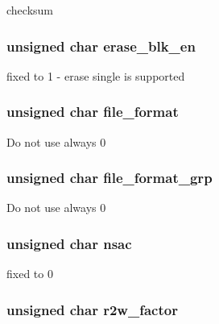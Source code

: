 checksum \hypertarget{struct_c_s_d_v2_aa0ada858f4a1455c6cb4e9b7523d8fd1}{
\subsubsection[{erase\-\_\-blk\-\_\-en}]{\setlength{\rightskip}{0pt plus 5cm}unsigned char erase\-\_\-blk\-\_\-en}}\label{struct_c_s_d_v2_aa0ada858f4a1455c6cb4e9b7523d8fd1}
fixed to 1 -\/ erase single is supported \hypertarget{struct_c_s_d_v2_aa1a7dd102774cf915cbe66010250253d}{
\subsubsection[{file\-\_\-format}]{\setlength{\rightskip}{0pt plus 5cm}unsigned char file\-\_\-format}}\label{struct_c_s_d_v2_aa1a7dd102774cf915cbe66010250253d}
Do not use always 0 \hypertarget{struct_c_s_d_v2_aa44f7b6ef5fd710a716fa9ef045c68f0}{
\subsubsection[{file\-\_\-format\-\_\-grp}]{\setlength{\rightskip}{0pt plus 5cm}unsigned char file\-\_\-format\-\_\-grp}}\label{struct_c_s_d_v2_aa44f7b6ef5fd710a716fa9ef045c68f0}
Do not use always 0 \hypertarget{struct_c_s_d_v2_a877524d1f9ede3c07079957826d08a1e}{
\subsubsection[{nsac}]{\setlength{\rightskip}{0pt plus 5cm}unsigned char nsac}}\label{struct_c_s_d_v2_a877524d1f9ede3c07079957826d08a1e}
fixed to 0 \hypertarget{struct_c_s_d_v2_acbc1184d8705d3631d9492f927ccb8e8}{
\subsubsection[{r2w\-\_\-factor}]{\setlength{\rightskip}{0pt plus 5cm}unsigned char r2w\-\_\-factor}}\label{struct_c_s_d_v2_acbc1184d8705d3631d9492f927ccb8e8}
